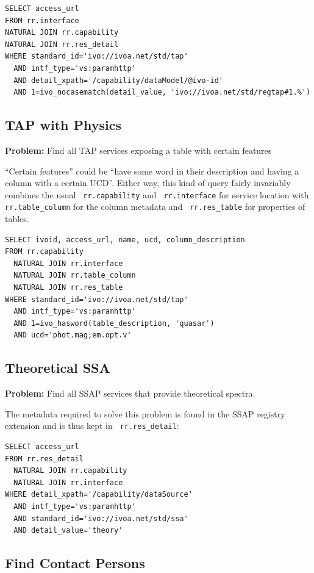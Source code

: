 \documentclass[11pt,a4paper]{ivoa}
\newcommand{\rtent}[1]{\texttt{\color{rtcolor} #1}}
\begin{document}
\begin{verbatim}
SELECT access_url
FROM rr.interface
NATURAL JOIN rr.capability
NATURAL JOIN rr.res_detail
WHERE standard_id='ivo://ivoa.net/std/tap'
  AND intf_type='vs:paramhttp'
  AND detail_xpath='/capability/dataModel/@ivo-id'
  AND 1=ivo_nocasematch(detail_value, 'ivo://ivoa.net/std/regtap#1.%')
\end{verbatim}

\subsection{TAP with Physics}

\textbf{Problem:} Find all TAP services
exposing a table with certain features

``Certain features'' could be ``have some word in their description
and having a column with a certain UCD''.  Either way, this kind of query
fairly invariably combines the usual 
\rtent{rr.capability} and 
\rtent{rr.interface}
 for service location with
\rtent{rr.table\_column}
 for the column metadata
and 
\rtent{rr.res\_table} for properties of tables.


\begin{verbatim}
SELECT ivoid, access_url, name, ucd, column_description
FROM rr.capability 
  NATURAL JOIN rr.interface
  NATURAL JOIN rr.table_column
  NATURAL JOIN rr.res_table
WHERE standard_id='ivo://ivoa.net/std/tap'
  AND intf_type='vs:paramhttp'
  AND 1=ivo_hasword(table_description, 'quasar')
  AND ucd='phot.mag;em.opt.v'
\end{verbatim}

\subsection{Theoretical SSA}

\textbf{Problem:} Find all SSAP services that
provide theoretical spectra.

The metadata required to solve this problem is found in the SSAP
registry extension and is thus kept in 
\rtent{rr.res\_detail}:


\begin{verbatim}
SELECT access_url 
FROM rr.res_detail 
  NATURAL JOIN rr.capability 
  NATURAL JOIN rr.interface 
WHERE detail_xpath='/capability/dataSource' 
  AND intf_type='vs:paramhttp'
  AND standard_id='ivo://ivoa.net/std/ssa'
  AND detail_value='theory'
\end{verbatim}


\subsection{Find Contact Persons}
\end{document}
